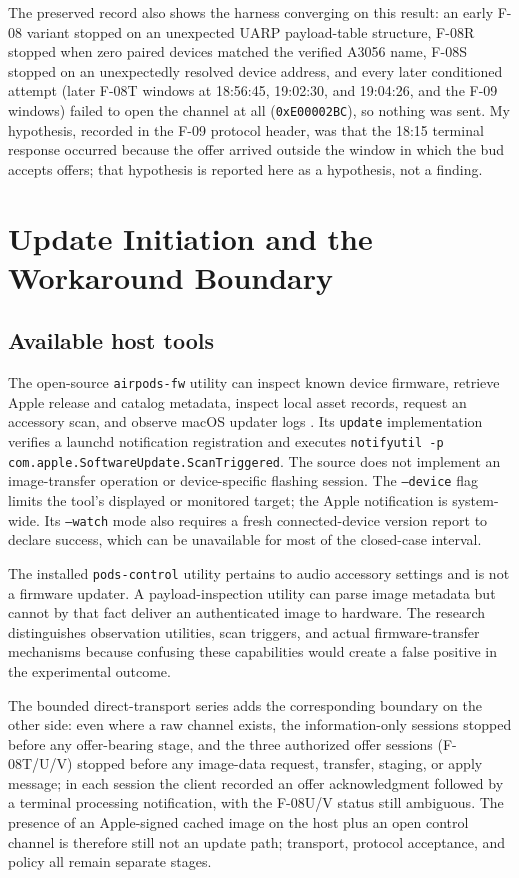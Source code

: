 \documentclass[11pt,letterpaper]{article}
\begin{document}
The preserved record also shows the harness converging on this result: an early F-08 variant stopped on an unexpected UARP payload-table structure, F-08R stopped when zero paired devices matched the verified A3056 name, F-08S stopped on an unexpectedly resolved device address, and every later conditioned attempt (later F-08T windows at 18:56:45, 19:02:30, and 19:04:26, and the F-09 windows) failed to open the channel at all (\texttt{0xE00002BC}), so nothing was sent. My hypothesis, recorded in the F-09 protocol header, was that the 18:15 terminal response occurred because the offer arrived outside the window in which the bud accepts offers; that hypothesis is reported here as a hypothesis, not a finding.

\section{Update Initiation and the Workaround Boundary}\label{sec:intervention}
\subsection{Available host tools}
The open-source \texttt{airpods-fw} utility can inspect known device firmware, retrieve Apple release and catalog metadata, inspect local asset records, request an accessory scan, and observe macOS updater logs \cite{airpodsfw}. Its \texttt{update} implementation verifies a launchd notification registration and executes \texttt{notifyutil -p com.apple.SoftwareUpdate.ScanTriggered}. The source does not implement an image-transfer operation or device-specific flashing session. The \texttt{--device} flag limits the tool's displayed or monitored target; the Apple notification is system-wide. Its \texttt{--watch} mode also requires a fresh connected-device version report to declare success, which can be unavailable for most of the closed-case interval.

The installed \texttt{pods-control} utility pertains to audio accessory settings and is not a firmware updater. A payload-inspection utility can parse image metadata but cannot by that fact deliver an authenticated image to hardware. The research distinguishes observation utilities, scan triggers, and actual firmware-transfer mechanisms because confusing these capabilities would create a false positive in the experimental outcome.

The bounded direct-transport series adds the corresponding boundary on the other side: even where a raw channel exists, the information-only sessions stopped before any offer-bearing stage, and the three authorized offer sessions (F-08T/U/V) stopped before any image-data request, transfer, staging, or apply message; in each session the client recorded an offer acknowledgment followed by a terminal processing notification, with the F-08U/V status still ambiguous. The presence of an Apple-signed cached image on the host plus an open control channel is therefore still not an update path; transport, protocol acceptance, and policy all remain separate stages.
\end{document}
